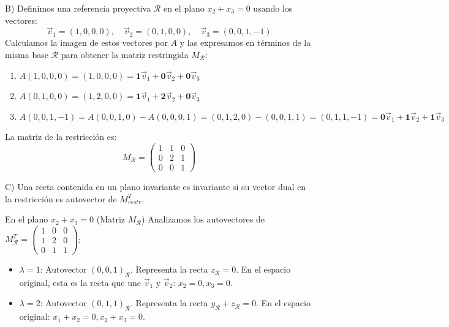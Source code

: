 {B)
Definimos una referencia proyectiva $\mathcal{R}$ en el plano $x_2+x_3=0$ usando los vectores:
\[ \vec{v}_1 = (1,0,0,0), \quad \vec{v}_2 = (0,1,0,0), \quad \vec{v}_3 = (0,0,1,-1) \]
Calculamos la imagen de estos vectores por $A$ y las expresamos en términos de la misma base $\mathcal{R}$ para obtener la matriz restringida $M_{\mathcal{R}}$:
\begin{enumerate}
    \item $A(1,0,0,0) = (1,0,0,0) = \mathbf{1}\vec{v}_1 + \mathbf{0}\vec{v}_2 + \mathbf{0}\vec{v}_3$
    \item $A(0,1,0,0) = (1,2,0,0) = \mathbf{1}\vec{v}_1 + \mathbf{2}\vec{v}_2 + \mathbf{0}\vec{v}_3$
    \item $A(0,0,1,-1) = A(0,0,1,0) - A(0,0,0,1) = (0,1,2,0) - (0,0,1,1) = (0,1,1,-1) = \mathbf{0}\vec{v}_1 + \mathbf{1}\vec{v}_2 + \mathbf{1}\vec{v}_3$
\end{enumerate}
La matriz de la restricción es:
\[ M_{\mathcal{R}} = \begin{pmatrix} 1 & 1 & 0 \\ 0 & 2 & 1 \\ 0 & 0 & 1 \end{pmatrix} \]

C)
Una recta contenida en un plano invariante es invariante si su vector dual en la restricción es autovector de $M_{restr}^T$.

En el plano $x_2+x_3=0$ (Matriz $M_{\mathcal{R}}$)
Analizamos los autovectores de $M_{\mathcal{R}}^T = \begin{pmatrix} 1 & 0 & 0 \\ 1 & 2 & 0 \\ 0 & 1 & 1 \end{pmatrix}$:
\begin{itemize}
    \item $\lambda=1$: Autovector $(0,0,1)_{\mathcal{R}}$. Representa la recta $z_{\mathcal{R}}=0$. En el espacio original, esta es la recta que une $\vec{v}_1$ y $\vec{v}_2$: \textbf{$x_2=0, x_3=0$}.
    \item $\lambda=2$: Autovector $(0,1,1)_{\mathcal{R}}$. Representa la recta $y_{\mathcal{R}}+z_{\mathcal{R}}=0$. En el espacio original: \textbf{$x_1+x_2=0, x_2+x_3=0$}.
\end{itemize}

}
